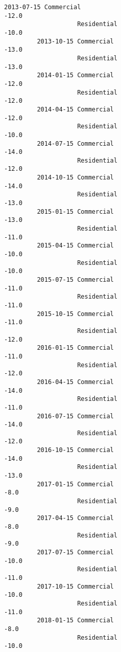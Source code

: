 \documentclass[11pt]{article}
\begin{document}
\begin{Verbatim}[commandchars=\\\{\}]
         2013-07-15 Commercial                                             -12.0   
                    Residential                                            -10.0   
         2013-10-15 Commercial                                             -13.0   
                    Residential                                            -13.0   
         2014-01-15 Commercial                                             -12.0   
                    Residential                                            -12.0   
         2014-04-15 Commercial                                             -12.0   
                    Residential                                            -10.0   
         2014-07-15 Commercial                                             -14.0   
                    Residential                                            -12.0   
         2014-10-15 Commercial                                             -14.0   
                    Residential                                            -13.0   
         2015-01-15 Commercial                                             -13.0   
                    Residential                                            -11.0   
         2015-04-15 Commercial                                             -10.0   
                    Residential                                            -10.0   
         2015-07-15 Commercial                                             -11.0   
                    Residential                                            -11.0   
         2015-10-15 Commercial                                             -11.0   
                    Residential                                            -12.0   
         2016-01-15 Commercial                                             -11.0   
                    Residential                                            -12.0   
         2016-04-15 Commercial                                             -14.0   
                    Residential                                            -11.0   
         2016-07-15 Commercial                                             -14.0   
                    Residential                                            -12.0   
         2016-10-15 Commercial                                             -14.0   
                    Residential                                            -13.0   
         2017-01-15 Commercial                                              -8.0   
                    Residential                                             -9.0   
         2017-04-15 Commercial                                              -8.0   
                    Residential                                             -9.0   
         2017-07-15 Commercial                                             -10.0   
                    Residential                                            -11.0   
         2017-10-15 Commercial                                             -10.0   
                    Residential                                            -11.0   
         2018-01-15 Commercial                                              -8.0   
                    Residential                                            -10.0   
         

\end{Verbatim}
\end{document}
